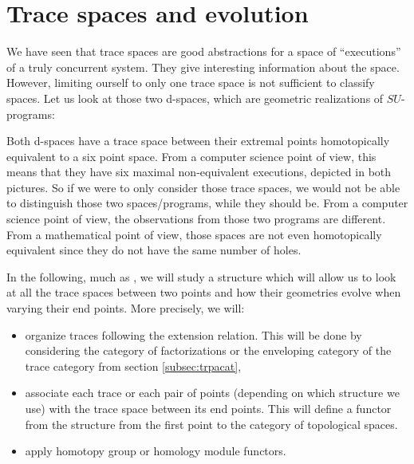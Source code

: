 \section{Trace spaces and evolution}
\label{sec:traspaevo}

We have seen that trace spaces are good abstractions for a space of ``executions'' of a truly concurrent system. They give interesting information about the space. However, limiting ourself to only one trace space is not sufficient to classify spaces. Let us look at those two d-spaces, which are geometric realizations of $SU$-programs:
	\begin{figure}[H]
		\begin{center}
    			
  		\end{center}
	\end{figure}
Both d-spaces have a trace space between their extremal points homotopically equivalent to a six point space. From a computer science point of view, this means that they have six maximal non-equivalent executions, depicted in both pictures. So if we were to only consider those trace spaces, we would not be able to distinguish those two spaces/programs, while they should be. From a computer science point of view, the observations from those two programs are different. From a mathematical point of view, those spaces are not even homotopically equivalent since they do not have the same number of holes.

\noindent In the following, much as \cite{raussen07}, we will study a structure which will allow us to look at all the trace spaces between two points and how their geometries evolve when varying their end points. More precisely, we will:
\begin{itemize}
	\item organize traces following the extension relation. This will be done by considering the category of factorizations or the enveloping category of the trace category from section \ref{subsec:trpacat},
	\item associate each trace or each pair of points (depending on which structure we use) with the trace space between its end points. This will define a functor from the structure from the first point to the category of topological spaces.
	\item apply homotopy group or homology module functors.
\end{itemize}

